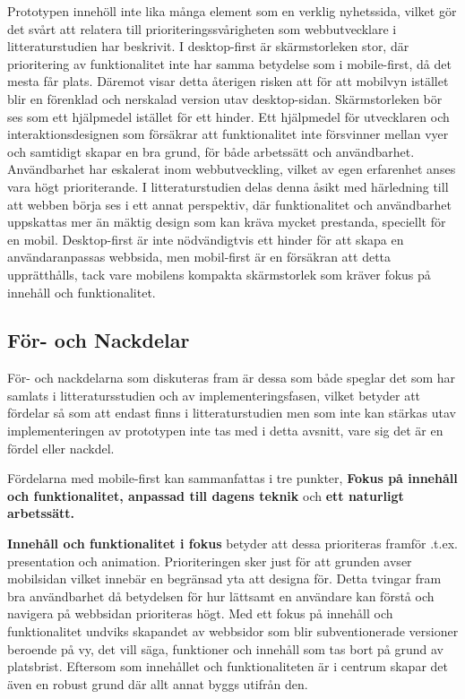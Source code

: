 \documentclass[11pt]{article}
\begin{document}
Prototypen innehöll inte lika många element som en verklig nyhetssida, vilket gör det svårt att relatera till prioriteringssvårigheten som webbutvecklare i litteraturstudien har beskrivit. I desktop-first är skärmstorleken stor, där prioritering av funktionalitet inte har samma betydelse som i mobile-first, då det mesta får plats. Däremot visar detta återigen risken att för att mobilvyn istället blir en förenklad och nerskalad version utav desktop-sidan. Skärmstorleken bör ses som ett hjälpmedel istället för ett hinder. Ett hjälpmedel för utvecklaren och interaktionsdesignen som försäkrar att funktionalitet inte försvinner mellan vyer och samtidigt skapar en bra grund, för både arbetssätt och användbarhet. Användbarhet har eskalerat inom webbutveckling, vilket av egen erfarenhet anses vara högt prioriterande. I litteraturstudien delas denna åsikt med härledning till att webben börja ses i ett annat perspektiv, där funktionalitet och användbarhet uppskattas mer än mäktig design som kan kräva mycket prestanda, speciellt för en mobil. Desktop-first är inte nödvändigtvis ett hinder för att skapa en användaranpassas webbsida, men mobil-first är en försäkran att detta upprätthålls, tack vare mobilens kompakta skärmstorlek som kräver fokus på innehåll och funktionalitet.

\subsection{För- och Nackdelar}
För- och nackdelarna som diskuteras fram är dessa som både speglar det som har samlats i litteratursstudien och av implementeringsfasen, vilket betyder att fördelar så som att endast finns i litteraturstudien men som inte kan stärkas utav implementeringen av prototypen inte tas med i detta avsnitt, vare sig det är en fördel eller nackdel.

Fördelarna med mobile-first kan sammanfattas i tre punkter, \textbf{Fokus på innehåll och funktionalitet, anpassad till dagens teknik} och \textbf{ett naturligt arbetssätt.} 

\textbf{Innehåll och funktionalitet i fokus} betyder att dessa prioriteras framför .t.ex. presentation och animation. Prioriteringen sker just för att grunden avser mobilsidan vilket innebär en begränsad yta att designa för. Detta tvingar fram bra användbarhet då betydelsen för hur lättsamt en användare kan förstå och navigera på webbsidan prioriteras högt. Med ett fokus på innehåll och funktionalitet undviks skapandet av webbsidor som blir subventionerade versioner beroende på vy, det vill säga, funktioner och innehåll som tas bort på grund av platsbrist. Eftersom som innehållet och funktionaliteten är i centrum skapar det även en robust grund där allt annat byggs utifrån den.
\end{document}
